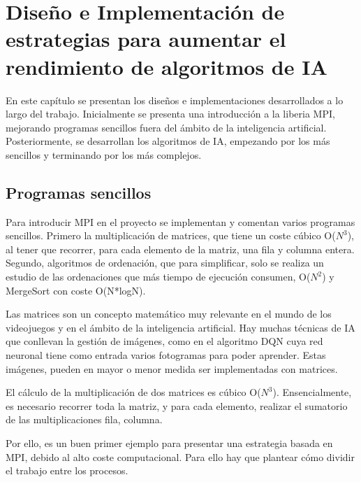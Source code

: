 

\chapter{Diseño e Implementación de estrategias para aumentar el rendimiento de algoritmos de IA}
\label{cap:c3_implementaciones}	


	
	En este capítulo se presentan los diseños e implementaciones desarrollados a lo largo del trabajo. Inicialmente se presenta una introducción a la liberia MPI, mejorando programas sencillos fuera del ámbito de la inteligencia artificial. Posteriormente, se desarrollan los algoritmos de IA, empezando por los más sencillos y terminando por los más complejos.

\section{Programas sencillos}

	Para introducir MPI en el proyecto se implementan y comentan varios programas sencillos. Primero la multiplicación de matrices, que tiene un coste cúbico O(\(N^{3}\)), al tener que recorrer, para cada elemento de la matriz, una fila y columna entera. Segundo, algoritmos de ordenación, que para simplificar, solo se realiza un estudio de las ordenaciones que más tiempo de ejecución consumen, O(\(N^{2}\)) y MergeSort con coste O(N*logN).


	Las matrices son un concepto matemático muy relevante en el mundo de los videojuegos y en el ámbito de la inteligencia artificial. Hay muchas técnicas de IA que conllevan la gestión de imágenes, como en el algoritmo DQN cuya red neuronal tiene como entrada varios fotogramas para poder aprender. Estas imágenes, pueden en mayor o menor medida ser implementadas con matrices.
	
	El cálculo de la multiplicación de dos matrices es cúbico O(\(N^{3}\)). Ensencialmente, es necesario recorrer toda la matriz, y para cada elemento, realizar el sumatorio de las multiplicaciones fila, columna. 
	
	Por ello, es un buen primer ejemplo para presentar una estrategia basada en MPI, debido al alto coste computacional. Para ello hay que plantear cómo dividir el trabajo entre los procesos. 
	
